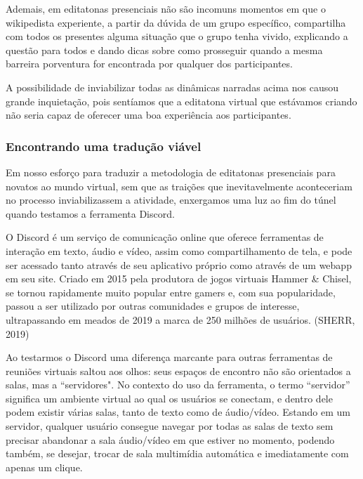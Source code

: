 Ademais, em editatonas presenciais não são incomuns momentos em que o wikipedista experiente, a partir da dúvida de um grupo específico, compartilha com todos os presentes alguma situação que o grupo tenha vivido, explicando a questão para todos e dando dicas sobre como prosseguir quando a mesma barreira porventura for encontrada por qualquer dos participantes.

A possibilidade de inviabilizar todas as dinâmicas narradas acima nos causou grande inquietação, pois sentíamos que a editatona virtual que estávamos criando não seria capaz de oferecer uma boa experiência aos participantes.

\subsubsection{Encontrando uma tradução viável}

Em nosso esforço para traduzir a metodologia de editatonas presenciais para novatos ao mundo virtual, sem que as traições que inevitavelmente aconteceriam no processo inviabilizassem a atividade, enxergamos uma luz ao fim do túnel quando testamos a ferramenta Discord.

O Discord é um serviço de comunicação online que oferece ferramentas de interação em texto, áudio e vídeo, assim como compartilhamento de tela, e pode ser acessado tanto através de seu aplicativo próprio como através de um webapp em seu site. Criado em 2015 pela produtora de jogos virtuais Hammer \& Chisel, se tornou rapidamente muito popular entre gamers e, com sua popularidade, passou a ser utilizado por outras comunidades e grupos de interesse, ultrapassando em meados de 2019 a marca de 250 milhões de usuários. (SHERR, 2019)

Ao testarmos o Discord uma diferença marcante para outras ferramentas de reuniões virtuais saltou aos olhos: seus espaços de encontro não são orientados a salas, mas a “servidores". No contexto do uso da ferramenta, o termo “servidor” significa um ambiente virtual ao qual os usuários se conectam, e dentro dele podem existir várias salas, tanto de texto como de áudio/vídeo. Estando em um servidor, qualquer usuário consegue navegar por todas as salas de texto sem precisar abandonar a sala áudio/vídeo em que estiver no momento, podendo também, se desejar, trocar de sala multimídia automática e imediatamente com apenas um clique.

